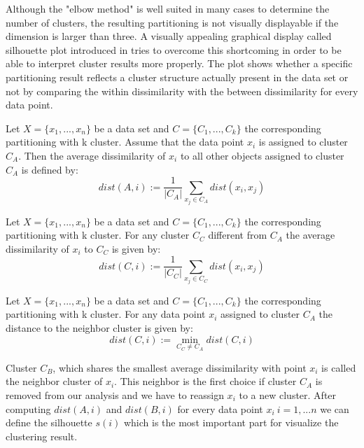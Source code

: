 Although the "elbow method" is well suited in many cases to determine the number of clusters, the resulting partitioning is not visually displayable if the dimension is larger than three. A visually appealing graphical display called silhouette plot introduced in \cite{rousseeuw1987silhouettes} tries to overcome this shortcoming in order to be able to interpret cluster results more properly. The plot shows whether a specific partitioning result reflects a cluster structure actually present in the data set or not by comparing the within dissimilarity with the between dissimilarity for every data point.

\begin{definition}
	Let $X=\{x_1, ..., x_n\}$ be a data set and $C=\{C_1, ..., C_k\}$ the corresponding partitioning with k cluster. Assume that the data point $x_i$ is assigned to cluster $C_A$. Then the average dissimilarity of $x_i$ to all other objects assigned to cluster $C_A$ is defined by: 
	\begin{equation*}\label{equ:dist_A}
	dist(A,i) := \frac{1}{|C_A|}\sum_{x_j \in C_A} dist(x_i, x_j)
	\end{equation*}
\end{definition}

\begin{definition}
	Let $X=\{x_1, ..., x_n\}$ be a data set and $C=\{C_1, ..., C_k\}$ the corresponding partitioning with k cluster. For any cluster $C_C$ different from $C_A$ the average dissimilarity of  $x_i$ to $C_C$ is given by: 
	\begin{equation*}\label{equ:dist_C}
		dist(C,i) := \frac{1}{|C_C|}\sum_{x_j \in C_C} dist(x_i, x_j)
	\end{equation*}
\end{definition}

\begin{definition}
	Let $X=\{x_1, ..., x_n\}$ be a data set and $C=\{C_1, ..., C_k\}$ the corresponding partitioning with k cluster. For any data point $x_i$ assigned to cluster $C_A$ the distance to the neighbor cluster is given by: 
	\begin{equation*}\label{equ:dist_B}
		dist(C,i) := \min_{C_C\neq C_A} dist(C,i)
	\end{equation*}
\end{definition}

Cluster $C_B$, which shares the smallest average dissimilarity with point $x_i$ is called the neighbor cluster of $x_i$. This neighbor is the first choice if cluster $C_A$ is removed from our analysis and we have to reassign $x_i$ to a new cluster. After computing $dist(A,i)$ and $dist(B,i)$ for every data point $x_i~i=1,...n$ we can define the silhouette $s(i)$ which is the most important part for visualize the clustering result.

